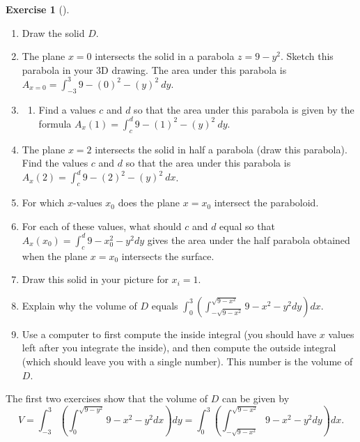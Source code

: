 \documentclass[10pt,]{book}
\theoremstyle{plain}
\theoremstyle{definition}
\theoremstyle{definition}
\theoremstyle{definition}
\theoremstyle{definition}
\newtheorem{exploration}[project]{Exercise}
\theoremstyle{definition}
\numberwithin{equation}{section}
\newcommand{\ds}{\displaystyle}
\begin{document}
\begin{exploration}[]\label{exploration-250}
\leavevmode%
\begin{enumerate}[font=\bfseries,label=(\alph*),ref=\alph*]
\item\label{task-671} Draw the solid \(D\).%
\item\label{task-672} The plane \(x=0\) intersects the solid in a parabola \(z=9-y^2\). Sketch this parabola in your 3D drawing. The area under this parabola is \(A_{x=0} = \int_{-3}^3 9-(0)^2-(y)^2 \ dy\).%
\item\label{task-673} \begin{enumerate}[font=\bfseries,label=(\roman*),ref=\theenumi.\roman*]
\item\label{task-674} Find a values \(c\) and \(d\) so that the area under this parabola is given by the formula \(A_x(1)=\int_c^{d} 9-(1)^2-(y)^2 \ dy\).%
\end{enumerate}
\item\label{task-675} The plane \(x=2\) intersects the solid in half a parabola (draw this parabola). Find the values \(c\) and \(d\) so that the area under this parabola is \(A_x(2)=\int_c^d 9-(2)^2-(y)^2 \ dx\).%
\item\label{task-676} For which \(x\)-values \(x_0\) does the plane \(x=x_0\) intersect the paraboloid.%
\item\label{task-677} For each of these values, what should \(c\) and \(d\) equal so that \(A_x(x_0) = \int_c^d 9-x_0^2-y^2 dy\) gives the area under the half parabola obtained when the plane \(x=x_0\) intersects the surface.%
\item\label{task-678} Draw this solid in your picture for \(x_i = 1\).%
\item\label{task-679} Explain why the volume of \(D\) equals \(\ds\int_{0}^{3} \left(\int_{-\sqrt{9-x^2}}^{\sqrt{9-x^2}}9-x^2-y^2 dy\right) dx\).%
\item\label{task-680} Use a computer to first compute the inside integral (you should have \(x\) values left after you integrate the inside), and then compute the outside integral (which should leave you with a single number). This number is the volume of \(D\).%
\end{enumerate}
\end{exploration}
The first two exercises show that the volume of \(D\) can be given by%
\begin{equation*}
V=\ds\int_{-3}^{3} \left(\int_0^{\sqrt{9-y^2}}9-x^2-y^2 dx\right) dy = \ds\int_{0}^{3} \left(\int_{-\sqrt{9-x^2}}^{\sqrt{9-x^2}}9-x^2-y^2 dy\right) dx.
\end{equation*}
\end{document}

